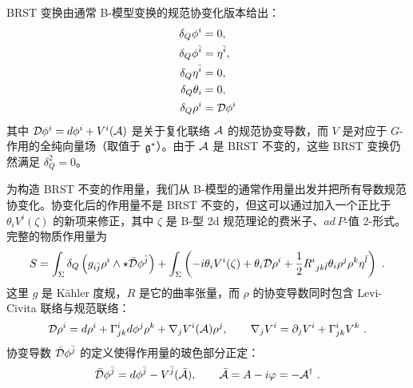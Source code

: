 BRST 变换由通常 B-模型变换的规范协变化版本给出：
\begin{align*}
\delta_Q\phi^i &= 0, \\
\delta_Q\phi^{\bar i} &= \eta^{\bar i}, \\
\delta_Q\eta^{\bar i} &= 0, \\
\delta_Q\theta_i &= 0, \\
\delta_Q\rho^i &= \mathcal{D}\phi^i
\end{align*}
其中 $\mathcal{D}\phi^i = d\phi^i + V^i(\mathcal{A})$ 是关于复化联络 $\mathcal{A}$ 的规范协变导数，而 $V$ 是对应于 $G$-作用的全纯向量场（取值于 $\mathfrak{g}^*$）。由于 $\mathcal{A}$
是 BRST 不变的，这些 BRST 变换仍然满足 $\delta_Q^2=0$。


为构造 BRST 不变的作用量，我们从 B-模型的通常作用量出发并把所有导数规范协变化。协变化后的作用量不是 BRST 不变的，但这可以通过加入一个正比于 $\theta_iV^i(\zeta)$ 的新项来修正，其中 $\zeta$ 是 B-型 2d 规范理论的费米子、$ad\,P$-值 2-形式。完整的物质作用量为
\[ S = \int_\Sigma\delta_Q\left(g_{i\bar j}\rho^i\wedge\star\bar\cD\phi^{\bar j}\right) + \int_\Sigma\left(-\ii\theta_iV^i(\zeta) + \theta_i\cD\rho^i + \frac{1}{2}R^i{}_{jk\bar l}\theta_i\rho^j\rho^k\eta^{\bar l}\right) \ . \]
这里 $g$ 是 Kähler 度规，$R$ 是它的曲率张量，而 $\rho$ 的协变导数同时包含 Levi-Civita 联络与规范联络：
\[ \mathcal{D}\rho^i = d\rho^i + \Gamma^i_{jk}d\phi^j\rho^k + \nabla_jV^i(\mathcal{A})\rho^j, \qquad \nabla_jV^i = \partial_jV^i + \Gamma^i_{jk}V^k \ . \]
协变导数 $\bar{\mathcal{D}}\phi^{\bar j}$ 的定义使得作用量的玻色部分正定：
\[ \bar\cD\phi^{\bar j} = d\phi^{\bar j} - V^{\bar j}(\bar\cA), \qquad \bar\cA = A - \ii\varphi = -\cA^\dagger \ . \]


